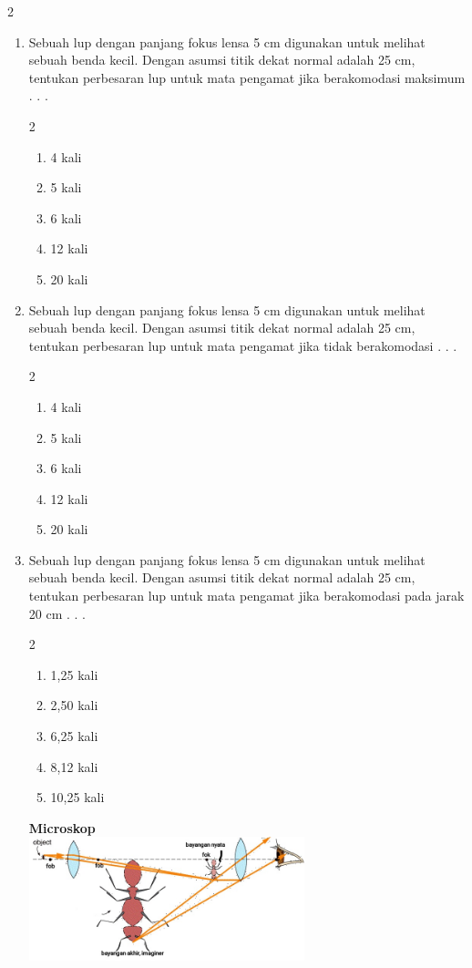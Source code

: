 \documentclass[10pt,a4paper]{extarticle}
\newcommand{\pilgani}[1]{                            \vspace{-0.3cm}\begin{multicols}{2}
 \begin{enumerate}[label=\Alph*., itemsep=0pt,topsep=0pt,leftmargin=*,align=Center]#1                     \end{enumerate}
 \phantom{ini cuma sapi, wedus, dan ayam}
 \end{multicols}}
\begin{document}
\begin{multicols*}{2}
\begin{enumerate}
\item Sebuah lup dengan panjang fokus lensa 5 cm digunakan untuk melihat sebuah benda kecil. Dengan asumsi titik dekat normal adalah 25 cm, tentukan perbesaran lup untuk mata pengamat jika berakomodasi maksimum . . .
\pilgani{
	\item 4 kali
	\item 5 kali
	\item 6 kali
	\item 12 kali
	\item 20 kali }
\vspace{2cm}

\item Sebuah lup dengan panjang fokus lensa 5 cm digunakan untuk melihat sebuah benda kecil. Dengan asumsi titik dekat normal adalah 25 cm, tentukan perbesaran lup untuk mata pengamat jika tidak berakomodasi . . .
\pilgani{
	\item 4 kali
	\item 5 kali
	\item 6 kali
	\item 12 kali
	\item 20 kali }
\vspace{2cm}

\item Sebuah lup dengan panjang fokus lensa 5 cm digunakan untuk melihat sebuah benda kecil. Dengan asumsi titik dekat normal adalah 25 cm, tentukan perbesaran lup untuk mata pengamat jika berakomodasi pada jarak 20 cm . . .
\pilgani{
	\item 1,25 kali
	\item 2,50 kali
	\item 6,25 kali
	\item 8,12 kali
	\item 10,25 kali }
\vspace{2cm}

\textbf{Microskop}\\
\includegraphics[width=8cm]{pic/mikroskop}


\end{enumerate}
\end{multicols*}
\end{document}
